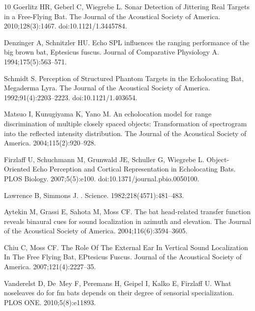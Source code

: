 \documentclass[10pt,letterpaper]{article}
\begin{document}
\begin{thebibliography}{10}
	Goerlitz HR, Geberl C, Wiegrebe L.
	\newblock Sonar Detection of Jittering Real Targets in a Free-Flying Bat.
	\newblock The Journal of the Acoustical Society of America. 2010;128(3):1467.
	\newblock doi:{10.1121/1.3445784}.
	
	Denzinger A, Schnitzler HU.
	\newblock Echo SPL influences the ranging performance of the big brown bat,
	Eptesicus fuscus.
	\newblock Journal of Comparative Physiology A. 1994;175(5):563--571.
	
	Schmidt S.
	\newblock Perception of Structured Phantom Targets in the Echolocating Bat,
	{{Megaderma}} Lyra.
	\newblock The Journal of the Acoustical Society of America.
	1992;91(4):2203--2223.
	\newblock doi:{10.1121/1.403654}.
	
	Matsuo I, Kunugiyama K, Yano M.
	\newblock An echolocation model for range discrimination of multiple closely
	spaced objects: Transformation of spectrogram into the reflected intensity
	distribution.
	\newblock The Journal of the Acoustical Society of America.
	2004;115(2):920--928.
	
	Firzlaff U, Schuchmann M, Grunwald JE, Schuller G, Wiegrebe L.
	\newblock Object-{{Oriented Echo Perception}} and {{Cortical Representation}}
	in {{Echolocating Bats}}.
	\newblock PLOS Biology. 2007;5(5):e100.
	\newblock doi:{10.1371/journal.pbio.0050100}.
	
	Lawrence B, Simmons J.
	.
	\newblock Science. 1982;218(4571):481--483.
	
	Aytekin M, Grassi E, Sahota M, Moss CF.
	\newblock The bat head-related transfer function reveals binaural cues for
	sound localization in azimuth and elevation.
	\newblock The Journal of the Acoustical Society of America.
	2004;116(6):3594--3605.
	
	Chiu C, Moss CF.
	\newblock The Role Of The External Ear In Vertical Sound Localization In The
	Free Flying Bat, {E}Ptesicus Fuscus.
	\newblock Journal of the Acoustical Society of America. 2007;121(4):2227--35.
	
	Vanderelst D, De~Mey F, Peremans H, Geipel I, Kalko E, Firzlaff U.
	\newblock What noseleaves do for fm bats depends on their degree of sensorial
	specialization.
	\newblock PLOS ONE. 2010;5(8):e11893.
	

\end{thebibliography}
\end{document}
